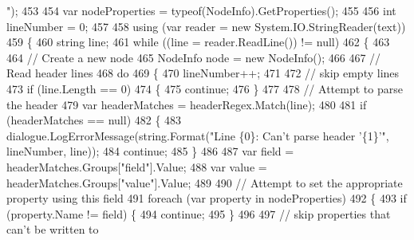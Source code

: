 \begin{DoxyCode}
{      "});
453 
454                     var nodeProperties = typeof(NodeInfo).GetProperties();
455 
456                     \textcolor{keywordtype}{int} lineNumber = 0;
457 
458                     \textcolor{keyword}{using} (var reader = \textcolor{keyword}{new} System.IO.StringReader(text))
459                     \{
460                         \textcolor{keywordtype}{string} line;
461                         \textcolor{keywordflow}{while} ((line = reader.ReadLine()) != null)
462                         \{
463 
464                             \textcolor{comment}{// Create a new node}
465                             NodeInfo node = \textcolor{keyword}{new} NodeInfo();
466 
467                             \textcolor{comment}{// Read header lines}
468                             \textcolor{keywordflow}{do}
469                             \{
470                                 lineNumber++;
471 
472                                 \textcolor{comment}{// skip empty lines}
473                                 \textcolor{keywordflow}{if} (line.Length == 0)
474                                 \{
475                                     \textcolor{keywordflow}{continue};
476                                 \}
477 
478                                 \textcolor{comment}{// Attempt to parse the header}
479                                 var headerMatches = headerRegex.Match(line);
480 
481                                 \textcolor{keywordflow}{if} (headerMatches == null)
482                                 \{
483                                     dialogue.LogErrorMessage(string.Format(\textcolor{stringliteral}{"Line \{0\}: Can't parse header
       '\{1\}'"}, lineNumber, line));
484                                     \textcolor{keywordflow}{continue};
485                                 \}
486 
487                                 var field = headerMatches.Groups[\textcolor{stringliteral}{"field"}].Value;
488                                 var value = headerMatches.Groups[\textcolor{stringliteral}{"value"}].Value;
489 
490                                 \textcolor{comment}{// Attempt to set the appropriate property using this field}
491                                 \textcolor{keywordflow}{foreach} (var property \textcolor{keywordflow}{in} nodeProperties)
492                                 \{
493                                     \textcolor{keywordflow}{if} (property.Name != field) \{
494                                         \textcolor{keywordflow}{continue};
495                                     \}
496 
497                                     \textcolor{comment}{// skip properties that can't be written to}

\end{DoxyCode}

